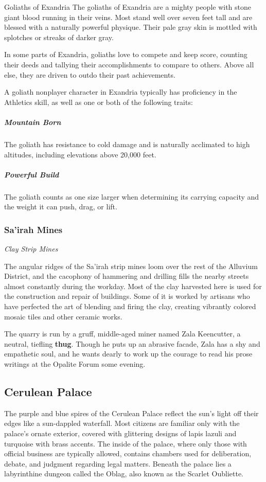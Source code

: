 \documentclass[10pt,a4paper,twoside,bg=print,twocolumn,openany,nodeprecatedcode]{dndbook}
\begin{document}
\begin{DndSidebar}[float=!b]{Goliaths of Exandria}
The goliaths of Exandria are a mighty people with stone giant blood running in their veins. Most stand well over seven feet tall and are blessed with a naturally powerful physique. Their pale gray skin is mottled with splotches or streaks of darker gray.



In some parts of Exandria, goliaths love to compete and keep score, counting their deeds and tallying their accomplishments to compare to others. Above all else, they are driven to outdo their past achievements.



A goliath nonplayer character in Exandria typically has proficiency in the Athletics skill, as well as one or both of the following traits:



\subparagraph{Mountain Born}
The goliath has resistance to cold damage and is naturally acclimated to high altitudes, including elevations above 20,000 feet.



\subparagraph{Powerful Build}
The goliath counts as one size larger when determining its carrying capacity and the weight it can push, drag, or lift.



\end{DndSidebar}

\subsubsection{Sa'irah Mines}
\textit{Clay Strip Mines}

The angular ridges of the Sa'irah strip mines loom over the rest of the Alluvium District, and the cacophony of hammering and drilling fills the nearby streets almost constantly during the workday. Most of the clay harvested here is used for the construction and repair of buildings. Some of it is worked by artisans who have perfected the art of blending and firing the clay, creating vibrantly colored mosaic tiles and other ceramic works.

The quarry is run by a gruff, middle-aged miner named Zala Keencutter, a neutral, tiefling \textbf{thug}. Though he puts up an abrasive facade, Zala has a shy and empathetic soul, and he wants dearly to work up the courage to read his prose writings at the Opalite Forum some evening.

\subsection{Cerulean Palace}
The purple and blue spires of the Cerulean Palace reflect the sun's light off their edges like a sun-dappled waterfall. Most citizens are familiar only with the palace's ornate exterior, covered with glittering designs of lapis lazuli and turquoise with brass accents. The inside of the palace, where only those with official business are typically allowed, contains chambers used for deliberation, debate, and judgment regarding legal matters. Beneath the palace lies a labyrinthine dungeon called the Oblag, also known as the Scarlet Oubliette.
\end{document}
